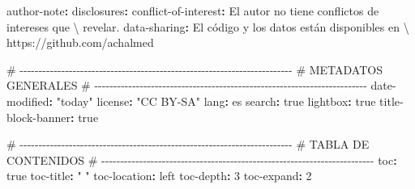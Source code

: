 \documentclass[
  doc,
  floatsintext,
  longtable,
  a4paper,
  nolmodern,
  notxfonts,
  notimes,
  12pt,
  colorlinks=true,linkcolor=blue,citecolor=blue,urlcolor=blue]{apa7}
\newenvironment{Shaded}{\begin{snugshade}}{\end{snugshade}}
\newcommand{\AttributeTok}[1]{\textcolor[rgb]{0.40,0.45,0.13}{#1}}
\newcommand{\CharTok}[1]{\textcolor[rgb]{0.13,0.47,0.30}{#1}}
\newcommand{\CommentTok}[1]{\textcolor[rgb]{0.37,0.37,0.37}{#1}}
\newcommand{\DecValTok}[1]{\textcolor[rgb]{0.68,0.00,0.00}{#1}}
\newcommand{\FunctionTok}[1]{\textcolor[rgb]{0.28,0.35,0.67}{#1}}
\newcommand{\KeywordTok}[1]{\textcolor[rgb]{0.00,0.23,0.31}{\textbf{#1}}}
\newcommand{\StringTok}[1]{\textcolor[rgb]{0.13,0.47,0.30}{#1}}
\begin{document}
\begin{Shaded}
\begin{Highlighting}[]
\FunctionTok{author{-}note}\KeywordTok{:}
\AttributeTok{  }\FunctionTok{disclosures}\KeywordTok{:}
\AttributeTok{    }\FunctionTok{conflict{-}of{-}interest}\KeywordTok{:}\AttributeTok{ El autor no tiene conflictos de intereses que \textbackslash{}}
\AttributeTok{    revelar.}
\AttributeTok{    }\FunctionTok{data{-}sharing}\KeywordTok{:}\AttributeTok{ El código y los datos están disponibles en \textbackslash{}}
\AttributeTok{    https://github.com/achalmed}

\CommentTok{\# {-}{-}{-}{-}{-}{-}{-}{-}{-}{-}{-}{-}{-}{-}{-}{-}{-}{-}{-}{-}{-}{-}{-}{-}{-}{-}{-}{-}{-}{-}{-}{-}{-}{-}{-}{-}{-}{-}{-}{-}{-}{-}{-}{-}{-}{-}{-}{-}{-}{-}{-}{-}{-}{-}{-}{-}{-}{-}{-}{-}{-}{-}{-}{-}{-}{-}{-}{-}{-}{-}{-}{-}}
\CommentTok{\# METADATOS GENERALES}
\CommentTok{\# {-}{-}{-}{-}{-}{-}{-}{-}{-}{-}{-}{-}{-}{-}{-}{-}{-}{-}{-}{-}{-}{-}{-}{-}{-}{-}{-}{-}{-}{-}{-}{-}{-}{-}{-}{-}{-}{-}{-}{-}{-}{-}{-}{-}{-}{-}{-}{-}{-}{-}{-}{-}{-}{-}{-}{-}{-}{-}{-}{-}{-}{-}{-}{-}{-}{-}{-}{-}{-}{-}{-}{-}}
\FunctionTok{date{-}modified}\KeywordTok{:}\AttributeTok{ }\StringTok{"today"}
\FunctionTok{license}\KeywordTok{:}\AttributeTok{ }\StringTok{"CC BY{-}SA"}
\FunctionTok{lang}\KeywordTok{:}\AttributeTok{ es}
\FunctionTok{search}\KeywordTok{:}\AttributeTok{ }\CharTok{true}
\FunctionTok{lightbox}\KeywordTok{:}\AttributeTok{ }\CharTok{true}
\FunctionTok{title{-}block{-}banner}\KeywordTok{:}\AttributeTok{ }\CharTok{true}

\CommentTok{\# {-}{-}{-}{-}{-}{-}{-}{-}{-}{-}{-}{-}{-}{-}{-}{-}{-}{-}{-}{-}{-}{-}{-}{-}{-}{-}{-}{-}{-}{-}{-}{-}{-}{-}{-}{-}{-}{-}{-}{-}{-}{-}{-}{-}{-}{-}{-}{-}{-}{-}{-}{-}{-}{-}{-}{-}{-}{-}{-}{-}{-}{-}{-}{-}{-}{-}{-}{-}{-}{-}{-}{-}}
\CommentTok{\# TABLA DE CONTENIDOS}
\CommentTok{\# {-}{-}{-}{-}{-}{-}{-}{-}{-}{-}{-}{-}{-}{-}{-}{-}{-}{-}{-}{-}{-}{-}{-}{-}{-}{-}{-}{-}{-}{-}{-}{-}{-}{-}{-}{-}{-}{-}{-}{-}{-}{-}{-}{-}{-}{-}{-}{-}{-}{-}{-}{-}{-}{-}{-}{-}{-}{-}{-}{-}{-}{-}{-}{-}{-}{-}{-}{-}{-}{-}{-}{-}}
\FunctionTok{toc}\KeywordTok{:}\AttributeTok{ }\CharTok{true}
\FunctionTok{toc{-}title}\KeywordTok{:}\AttributeTok{ }\StringTok{" "}
\FunctionTok{toc{-}location}\KeywordTok{:}\AttributeTok{ left}
\FunctionTok{toc{-}depth}\KeywordTok{:}\AttributeTok{ }\DecValTok{3}
\FunctionTok{toc{-}expand}\KeywordTok{:}\AttributeTok{ }\DecValTok{2}


\end{Highlighting}
\end{Shaded}
\end{document}
